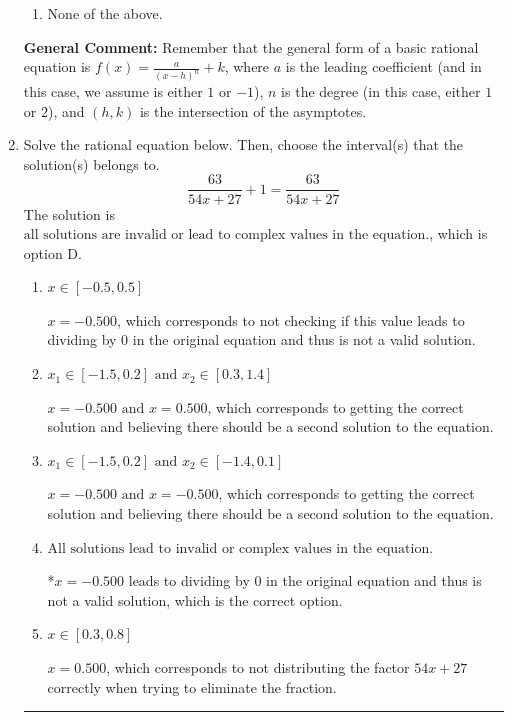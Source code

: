 \documentclass{extbook}[14pt]
\newcommand{\litem}[1]{\item #1

\rule{\textwidth}{0.4pt}}
\begin{document}
\begin{enumerate}
{\begin{enumerate}[label=\Alph*.]
\begin{multicols}{2}
\end{multicols}\item None of the above.\end{enumerate}
\textbf{General Comment:} Remember that the general form of a basic rational equation is $ f(x) = \frac{a}{(x-h)^n} + k$, where $a$ is the leading coefficient (and in this case, we assume is either $1$ or $-1$), $n$ is the degree (in this case, either $1$ or $2$), and $(h, k)$ is the intersection of the asymptotes.
}
\litem{
Solve the rational equation below. Then, choose the interval(s) that the solution(s) belongs to.
\[ \frac{63}{54x + 27} + 1 = \frac{63}{54x + 27} \]The solution is \( \text{all solutions are invalid or lead to complex values in the equation.} \), which is option D.\begin{enumerate}[label=\Alph*.]
\item \( x \in [-0.5,0.5] \)

$x = -0.500$, which corresponds to not checking if this value leads to dividing by 0 in the original equation and thus is not a valid solution.
\item \( x_1 \in [-1.5, 0.2] \text{ and } x_2 \in [0.3,1.4] \)

$x = -0.500 \text{ and } x = 0.500$, which corresponds to getting the correct solution and believing there should be a second solution to the equation.
\item \( x_1 \in [-1.5, 0.2] \text{ and } x_2 \in [-1.4,0.1] \)

$x = -0.500 \text{ and } x = -0.500$, which corresponds to getting the correct solution and believing there should be a second solution to the equation.
\item \( \text{All solutions lead to invalid or complex values in the equation.} \)

*$x = -0.500$ leads to dividing by 0 in the original equation and thus is not a valid solution, which is the correct option.
\item \( x \in [0.3,0.8] \)

$x = 0.500$, which corresponds to not distributing the factor $54x + 27$ correctly when trying to eliminate the fraction.
\end{enumerate}

}
\end{enumerate}
\end{document}
